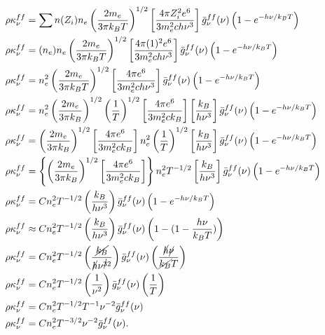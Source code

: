 \documentclass[12pt]{article}
\begin{document}
\begin{equation*}
\begin{split}
    \rho\kappa_\nu^{ff} &= \sum n(Z_i)n_e\left(\frac{2m_e}{3\pi k_BT}\right)^{1/2}\left[\frac{4\pi Z_i^2e^6}{3m_e^2ch\nu^3}\right]\bar{g}_\nu^{ff}(\nu)\left(1-e^{-h\nu/k_BT}\right) \\
    \rho\kappa_\nu^{ff} &= (n_e)n_e\left(\frac{2m_e}{3\pi k_BT}\right)^{1/2}\left[\frac{4\pi (1)^2e^6}{3m_e^2ch\nu^3}\right]\bar{g}_\nu^{ff}(\nu)\left(1-e^{-h\nu/k_BT}\right) \\
    \rho\kappa_\nu^{ff} &= n_e^2\left(\frac{2m_e}{3\pi k_BT}\right)^{1/2}\left[\frac{4\pi e^6}{3m_e^2ch\nu^3}\right]\bar{g}_\nu^{ff}(\nu)\left(1-e^{-h\nu/k_BT}\right) \\
    \rho\kappa_\nu^{ff} &= n_e^2\left(\frac{2m_e}{3\pi k_B}\right)^{1/2} \left(\frac{1}{T}\right)^{1/2}\left[\frac{4\pi e^6}{3m_e^2ck_B}\right] \left[\frac{k_B}{h\nu^3}\right]\bar{g}_\nu^{ff}(\nu)\left(1-e^{-h\nu/k_BT}\right) \\
    \rho\kappa_\nu^{ff} &= \left(\frac{2m_e}{3\pi k_B}\right)^{1/2} \left[\frac{4\pi e^6}{3m_e^2ck_B}\right]n_e^2 \left(\frac{1}{T}\right)^{1/2} \left[\frac{k_B}{h\nu^3}\right]\bar{g}_\nu^{ff}(\nu)\left(1-e^{-h\nu/k_BT}\right) \\
    \rho\kappa_\nu^{ff} &= \left\{\left(\frac{2m_e}{3\pi k_B}\right)^{1/2} \left[\frac{4\pi e^6}{3m_e^2ck_B}\right]\right\} n_e^2 T^{-1/2} \left[\frac{k_B}{h\nu^3}\right]\bar{g}_\nu^{ff}(\nu)\left(1-e^{-h\nu/k_BT}\right) \\
    \rho\kappa_\nu^{ff} &= C n_e^2 T^{-1/2} \left(\frac{k_B}{h\nu^3}\right)\bar{g}_\nu^{ff}(\nu)\left(1-e^{-h\nu/k_BT}\right) \\
    \rho\kappa_\nu^{ff} &\approx C n_e^2 T^{-1/2} \left(\frac{k_B}{h\nu^3}\right)\bar{g}_\nu^{ff}(\nu)\left(1-(1-\frac{h\nu}{k_BT})\right) \\
    \rho\kappa_\nu^{ff} &= C n_e^2 T^{-1/2} \left(\frac{\cancel{k_B}}{\cancel{h}\nu^{\cancel{3}2}}\right)\bar{g}_\nu^{ff}(\nu)\left(\frac{\cancel{h}\cancel{\nu}}{\cancel{k_B}T}\right) \\
    \rho\kappa_\nu^{ff} &= C n_e^2 T^{-1/2} \left(\frac{1}{\nu^2}\right)\bar{g}_\nu^{ff}(\nu)\left(\frac{1}{T}\right) \\
    \rho\kappa_\nu^{ff} &= C n_e^2 T^{-1/2}T^{-1} \nu^{-2}\bar{g}_\nu^{ff}(\nu) \\
    \rho\kappa_\nu^{ff} &= C n_e^2 T^{-3/2} \nu^{-2}\bar{g}_\nu^{ff}(\nu).
\end{split}
\end{equation*}
\end{document}

